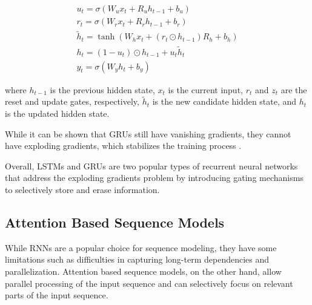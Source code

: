 \begin{align}
    u_t = \sigma(W_u x_t + R_u h_{t-1} + b_u)\\
    r_t = \sigma(W_r x_t + R_r h_{t-1} + b_r)\\
    \tilde{h}_t = \tanh(W_h x_t + (r_t \odot h_{t-1})R_h + b_h)\\
    h_t = (1 - u_t) \odot h_{t-1} + u_t \tilde{h}_t\\
    y_t = \sigma(W_y h_t + b_y)
\end{align}



where $h_{t-1}$ is the previous hidden state, $x_t$ is the current input, $r_t$ and $z_t$ are the reset and update gates, respectively, $\tilde{h}_t$ is the new candidate hidden state, and $h_t$ is the updated hidden state.

While it can be shown that GRUs still have vanishing gradients, they cannot have exploding gradients, which stabilizes the training process \cite{https://arxiv.org/pdf/2107.02248.pdf}.

Overall, LSTMs and GRUs are two popular types of recurrent neural networks that address the exploding gradients problem by introducing gating mechanisms to 
selectively store and erase information. 

\subsection{Attention Based Sequence Models}

While RNNs are a popular choice for sequence modeling, they have some limitations such as difficulties in capturing long-term dependencies and parallelization.
Attention based sequence models, on the other hand, allow parallel processing of the input sequence and can selectively focus on relevant parts of the 
input sequence. \\

